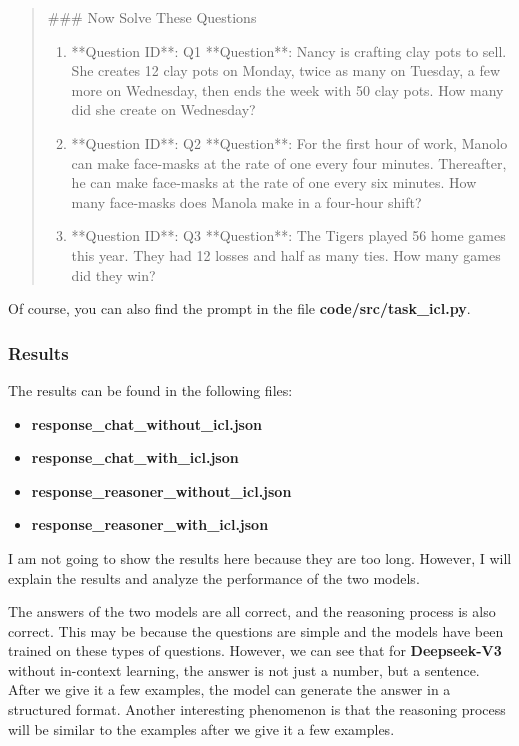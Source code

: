 \documentclass[a4paper,12pt]{article}
\begin{document}
\begin{quote}
    \#\#\# Now Solve These Questions
    \begin{enumerate}
        \item **Question ID**: Q1  
            **Question**: Nancy is crafting clay pots to sell. She creates 12 clay pots on Monday, twice as many on Tuesday, a few more on Wednesday, then ends the week with 50 clay pots. How many did she create on Wednesday?  
        \item **Question ID**: Q2  
            **Question**: For the first hour of work, Manolo can make face-masks at the rate of one every four minutes. Thereafter, he can make face-masks at the rate of one every six minutes. How many face-masks does Manola make in a four-hour shift?  
        \item **Question ID**: Q3  
            **Question**: The Tigers played 56 home games this year. They had 12 losses and half as many ties. How many games did they win? 
    \end{enumerate} 
\end{quote}

Of course, you can also find the prompt in the file \textbf{code/src/task\_icl.py}.

\subsubsection{Results}

The results can be found in the following files:
\begin{itemize}
    \item \textbf{response\_chat\_without\_icl.json}
    \item \textbf{response\_chat\_with\_icl.json}
    \item \textbf{response\_reasoner\_without\_icl.json}
    \item \textbf{response\_reasoner\_with\_icl.json}
\end{itemize}
I am not going to show the results here because they are too long. However, I will explain the results and analyze the performance of the two models.

The answers of the two models are all correct, and the reasoning process is also correct. This may be because the questions are simple and the models have been trained on these types of questions. However, we can see that for \textbf{Deepseek-V3} without in-context learning, the answer is not just a number, but a sentence. After we give it a few examples, the model can generate the answer in a structured format. Another interesting phenomenon is that the reasoning process will be similar to the examples after we give it a few examples. 
\end{document}
